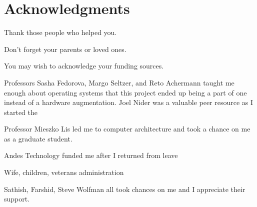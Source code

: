 
\chapter{Acknowledgments}

Thank those people who helped you. 

Don't forget your parents or loved ones.

You may wish to acknowledge your funding sources.

Professors Sasha Fedorova, Margo Seltzer, and Reto Achermann taught me enough about operating systems that this project ended up being a part of one instead of a hardware augmentation. Joel Nider was a valuable peer resource as I started the 

Professor Mieszko Lis led me to computer architecture and took a chance on me as a graduate student.

Andes Technology funded me after I returned from leave

Wife, children, veterans administration

Sathish, Farshid, Steve Wolfman all took chances on me and I appreciate their support.